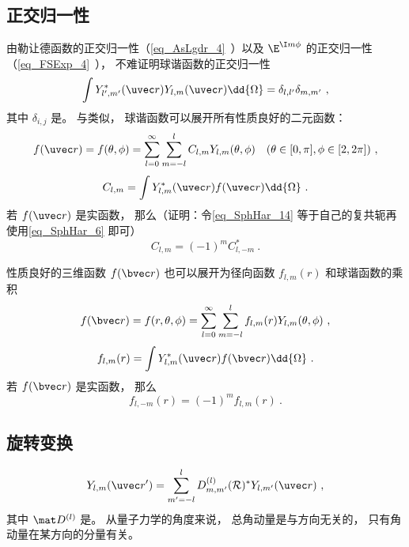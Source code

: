 \subsection{正交归一性}
由勒让德函数的正交归一性（\autoref{eq_AsLgdr_4}~）以及 $\E^{\I m \phi}$  的正交归一性（\autoref{eq_FSExp_4}~）， 不难证明球谐函数的正交归一性
\begin{equation}
\int Y_{l', m'}^*(\uvec r) Y_{l, m} (\uvec r) \dd{\Omega} = \delta_{l,l'}\delta_{m,m'}~,
\end{equation}
其中 $\delta_{i,j}$ 是。 与类似， 球谐函数可以展开所有性质良好的二元函数：
\begin{equation}\label{eq_SphHar_14}
f(\uvec r) = f(\theta, \phi) = \sum_{l = 0}^\infty\sum_{m=-l}^l C_{l,m}Y_{l,m}(\theta, \phi) \quad (\theta \in [0, \pi], \phi \in [2, 2\pi])~,
\end{equation}
\begin{equation}
C_{l,m} = \int Y^*_{l,m}(\uvec r) f(\uvec r) \dd{\Omega}~.
\end{equation}
若 $f(\uvec r)$ 是实函数， 那么（证明：令\autoref{eq_SphHar_14} 等于自己的复共轭再使用\autoref{eq_SphHar_6} 即可）
\begin{equation}\label{eq_SphHar_13}
C_{l,m} = (-1)^m C_{l,-m}^*~.
\end{equation}

性质良好的三维函数 $f(\bvec r)$ 也可以展开为径向函数 $f_{l,m}(r)$ 和球谐函数的乘积
\begin{equation}\label{eq_SphHar_9}
f(\bvec r) = f(r, \theta, \phi) = \sum_{l = 0}^\infty\sum_{m=-l}^l f_{l,m}(r) Y_{l,m}(\theta, \phi)~,
\end{equation}
\begin{equation}\label{eq_SphHar_7}
f_{l,m}(r) = \int Y^*_{l,m}(\uvec r) f(\bvec r) \dd{\Omega}~.
\end{equation}
若 $f(\bvec r)$ 是实函数， 那么
\begin{equation}
f_{l,-m}(r) = (-1)^m f_{l,m}(r)~.
\end{equation}

\subsection{旋转变换}
\begin{equation}
Y_{l,m}(\uvec r') = \sum_{m'=-l}^l D_{m,m'}^{(l)} (\mathcal R)^* Y_{l,m'}(\uvec r)~,
\end{equation}
其中 $\mat D^{(l)}$ 是。 从量子力学的角度来说， 总角动量是与方向无关的， 只有角动量在某方向的分量有关。

